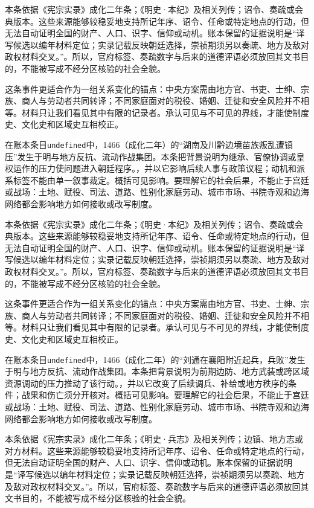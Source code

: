 本条依据《宪宗实录》成化二年条；《明史·本纪》及相关列传；诏令、奏疏或会典版本。这些来源能够较稳妥地支持所记年序、诏令、任命或特定地点的行动，但无法自动证明全国的财产、人口、识字、信仰或动机。账本保留的证据说明是“译写候选以编年材料定位；实录记载反映朝廷选择，崇祯期须另以奏疏、地方及敌对政权材料交叉。”。所以，官府标签、奏疏数字与后来的道德评语必须放回其文书目的，不能被写成不经分区核验的社会全貌。

这条事件更适合作为一组关系变化的锚点：中央方案需由地方官、书吏、士绅、宗族、商人与劳动者共同转译；不同家庭面对的税役、婚姻、迁徙和安全风险并不相等。材料只让我们看见其中有限的记录者。承认可见与不可见的界线，才能使制度史、文化史和区域史互相校正。

在账本条目\texttt{undefined}中，1466（成化二年）的“湖南及川黔边境苗族叛乱遭镇压”发生于明与地方反抗、流动作战集团。本条把背景说明为继承、官僚协调或皇权运作的压力使问题进入朝廷程序。，并以它影响后续人事与政策议程；动机和派系标签不能由单一叙事裁定。概括可见影响。要理解它的社会后果，不能止于宫廷或战场：土地、赋役、司法、道路、性别化家庭劳动、城市市场、书院寺观和边海网络都会影响地方如何接收或改写制度。

本条依据《宪宗实录》成化二年条；《明史·本纪》及相关列传；诏令、奏疏或会典版本。这些来源能够较稳妥地支持所记年序、诏令、任命或特定地点的行动，但无法自动证明全国的财产、人口、识字、信仰或动机。账本保留的证据说明是“译写候选以编年材料定位；实录记载反映朝廷选择，崇祯期须另以奏疏、地方及敌对政权材料交叉。”。所以，官府标签、奏疏数字与后来的道德评语必须放回其文书目的，不能被写成不经分区核验的社会全貌。

这条事件更适合作为一组关系变化的锚点：中央方案需由地方官、书吏、士绅、宗族、商人与劳动者共同转译；不同家庭面对的税役、婚姻、迁徙和安全风险并不相等。材料只让我们看见其中有限的记录者。承认可见与不可见的界线，才能使制度史、文化史和区域史互相校正。

在账本条目\texttt{undefined}中，1466（成化二年）的“刘通在襄阳附近起兵，兵败”发生于明与地方反抗、流动作战集团。本条把背景说明为前期边防、地方武装或跨区域资源调动的压力推动了该行动。，并以它改变了后续调兵、补给或地方秩序的条件；战果和伤亡须分开核对。概括可见影响。要理解它的社会后果，不能止于宫廷或战场：土地、赋役、司法、道路、性别化家庭劳动、城市市场、书院寺观和边海网络都会影响地方如何接收或改写制度。

本条依据《宪宗实录》成化二年条；《明史·兵志》及相关列传；边镇、地方志或对方材料。这些来源能够较稳妥地支持所记年序、诏令、任命或特定地点的行动，但无法自动证明全国的财产、人口、识字、信仰或动机。账本保留的证据说明是“译写候选以编年材料定位；实录记载反映朝廷选择，崇祯期须另以奏疏、地方及敌对政权材料交叉。”。所以，官府标签、奏疏数字与后来的道德评语必须放回其文书目的，不能被写成不经分区核验的社会全貌。

